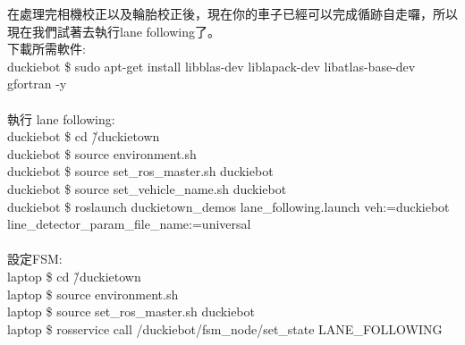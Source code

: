 \documentclass{article}
\begin{document}
在處理完相機校正以及輪胎校正後，現在你的車子已經可以完成循跡自走囉，所以現在我們試著去執行lane following了。
\\下載所需軟件:
\\duckiebot \$ sudo apt-get install libblas-dev liblapack-dev libatlas-base-dev gfortran -y
\\
\\執行 lane following:
\\duckiebot \$ cd \~/duckietown
\\duckiebot \$ source environment.sh
\\duckiebot \$ source set\_ros\_master.sh duckiebot
\\duckiebot \$ source set\_vehicle\_name.sh duckiebot
\\duckiebot \$ roslaunch duckietown\_demos lane\_following.launch veh:=duckiebot \\line\_detector\_param\_file\_name:=universal
\\
\\設定FSM:
\\laptop \$ cd \~/duckietown
\\laptop \$ source environment.sh
\\laptop \$ source set\_ros\_master.sh duckiebot
\\laptop \$ rosservice call /duckiebot/fsm\_node/set\_state LANE\_FOLLOWING
\end{document}
